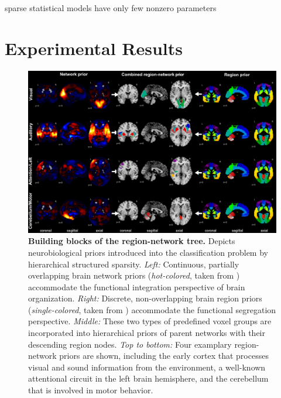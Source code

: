 \documentclass{article}
\begin{document}
sparse statistical models have only few nonzero parameters








\section{Experimental Results}


\begin{figure}
\begin{centering}
\includegraphics[width=1.00\textwidth]{../figures/reg_net_prior_colin.pdf}
\end{centering}
\vspace{-0.6cm}
\caption{\textbf{Building blocks of the region-network tree.}
Depicts neurobiological priors introduced into the classification problem 
by hierarchical structured sparsity.
\textit{Left:} Continuous, partially overlapping brain network priors
(\textit{hot-colored}, taken from \cite{smith2009})
accommodate the functional integration
perspective of brain organization.
\textit{Right:} Discrete, non-overlapping brain region priors
(\textit{single-colored}, taken from \cite{crad12})
accommodate the functional segregation perspective.
\textit{Middle:} These two types of predefined voxel groups are incorporated
into hierarchical priors of parent networks with their
descending region nodes.
\textit{Top to bottom:} Four examplary region-network priors
are shown, including
the early cortex that processes
visual and sound information from the environment,
a well-known attentional circuit in the left brain hemisphere,
and
the cerebellum that is involved in motor behavior.
}
\label{fig_priors}
\end{figure}
\end{document}
